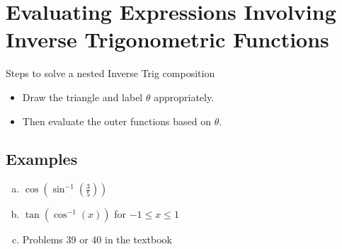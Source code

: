 \documentclass{tufte-handout}
\begin{document}
\section{Evaluating Expressions Involving Inverse Trigonometric Functions}

Steps to solve a nested Inverse Trig composition
\begin{itemize}
\item Draw the triangle and label $\theta$ appropriately.
\item Then evaluate the outer functions based on $\theta$.
\end{itemize}

\subsection{Examples}

\begin{enumerate}[(a)]
\item $\cos(\sin^{-1}(\frac{3}{5}))$
\item $\tan(\cos^{-1}(x))$ for $-1 \leq x \leq 1$
\item Problems 39 or 40 in the textbook
\end{enumerate}
\end{document}
